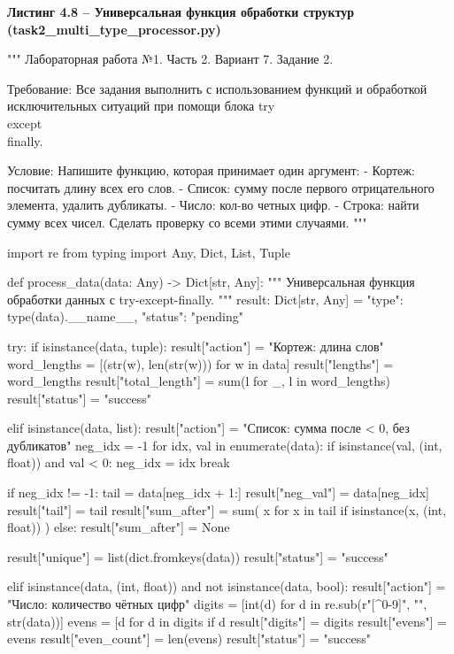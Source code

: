 \documentclass[14pt,a4paper]{extarticle}
\newcommand{\listingtitle}[1]{%
  \par\vspace{8pt}%
  \noindent\hspace*{1.25cm}\textbf{#1}\par\vspace{2pt}%
}
\begin{document}
\listingtitle{Листинг 4.8 -- Универсальная функция обработки структур (task2\_multi\_type\_processor.py)}
\begin{CodeListing}
"""
Лабораторная работа №1. Часть 2.
Вариант 7. Задание 2.

Требование:
Все задания выполнить с использованием функций и обработкой
исключительных ситуаций при помощи блока try\\except\\finally.

Условие:
Напишите функцию, которая принимает один аргумент:
- Кортеж: посчитать длину всех его слов.
- Список: сумму после первого отрицательного элемента, удалить дубликаты.
- Число: кол-во четных цифр.
- Строка: найти сумму всех чисел.
Сделать проверку со всеми этими случаями.
"""

import re
from typing import Any, Dict, List, Tuple


def process_data(data: Any) -> Dict[str, Any]:
    """
    Универсальная функция обработки данных с try-except-finally.
    """
    result: Dict[str, Any] = {
        "type": type(data).__name__, "status": "pending"
    }

    try:
        if isinstance(data, tuple):
            result["action"] = "Кортеж: длина слов"
            word_lengths = [(str(w), len(str(w))) for w in data]
            result["lengths"] = word_lengths
            result["total_length"] = sum(l for _, l in word_lengths)
            result["status"] = "success"

        elif isinstance(data, list):
            result["action"] = "Список: сумма после < 0, без дубликатов"
            neg_idx = -1
            for idx, val in enumerate(data):
                if isinstance(val, (int, float)) and val < 0:
                    neg_idx = idx
                    break

            if neg_idx != -1:
                tail = data[neg_idx + 1:]
                result["neg_val"] = data[neg_idx]
                result["tail"] = tail
                result["sum_after"] = sum(
                    x for x in tail if isinstance(x, (int, float))
                )
            else:
                result["sum_after"] = None

            result["unique"] = list(dict.fromkeys(data))
            result["status"] = "success"

        elif isinstance(data, (int, float)) and not isinstance(data, bool):
            result["action"] = "Число: количество чётных цифр"
            digits = [int(d) for d in re.sub(r"[^0-9]", "", str(data))]
            evens = [d for d in digits if d %
            result["digits"] = digits
            result["evens"] = evens
            result["even_count"] = len(evens)
            result["status"] = "success"


\end{CodeListing}
\end{document}
